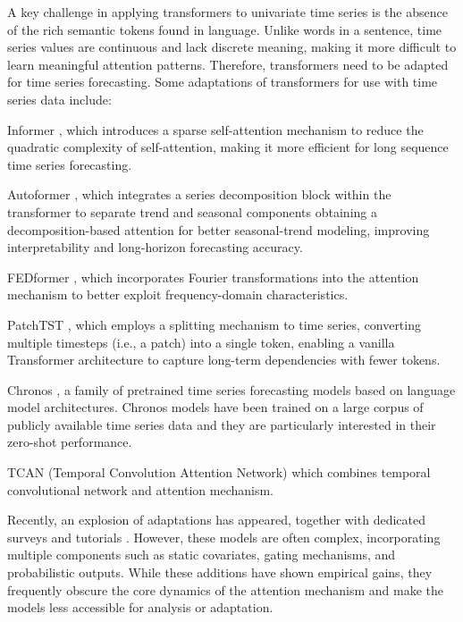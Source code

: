 \documentclass[algorithms,article,submit,pdftex,moreauthors]{Definitions/mdpi}
\begin{document}
A key challenge in applying transformers to univariate time series is the absence of the rich semantic tokens found in language. Unlike words in a sentence, time series values are continuous and lack discrete meaning, making it more difficult to learn meaningful attention patterns. Therefore, transformers need to be adapted for time series forecasting. Some adaptations of transformers for use with time series data include:

\begin{description}
	\item Informer \citep{ZZPZ21}, which introduces a sparse self-attention mechanism to reduce the quadratic complexity of self-attention, making it more efficient for long sequence time series forecasting.

	\item Autoformer \citep{WXWL22}, which integrates a series decomposition block within the transformer to separate trend and seasonal components obtaining a decomposition-based attention for better seasonal-trend modeling, improving interpretability and long-horizon forecasting accuracy.

	\item FEDformer \citep{ZMWW22}, which incorporates Fourier transformations into the attention mechanism to better exploit frequency-domain characteristics.

	\item PatchTST \citep{patchTST}, which employs a splitting mechanism to time series, converting multiple timesteps (i.e., a patch) into a single token, enabling a vanilla Transformer architecture to capture long-term dependencies with fewer tokens. 
	
	\item Chronos \citep{chronos}, a family of pretrained time series forecasting models based on language model architectures. Chronos models have been trained on a large corpus of publicly available time series data and they are particularly interested in their zero-shot performance.
	
	\item TCAN (Temporal Convolution Attention Network) \citep{tcan} which combines temporal convolutional network and attention mechanism. 
\end{description}

Recently, an explosion of adaptations has appeared, together with dedicated surveys and tutorials \cite{WZZC23, ANTS23, SZLW25}. However, these models are often complex, incorporating multiple components such as static covariates, gating mechanisms, and probabilistic outputs. While these additions have shown empirical gains, they frequently obscure the core dynamics of the attention mechanism and make the models less accessible for analysis or adaptation.
\end{document}
